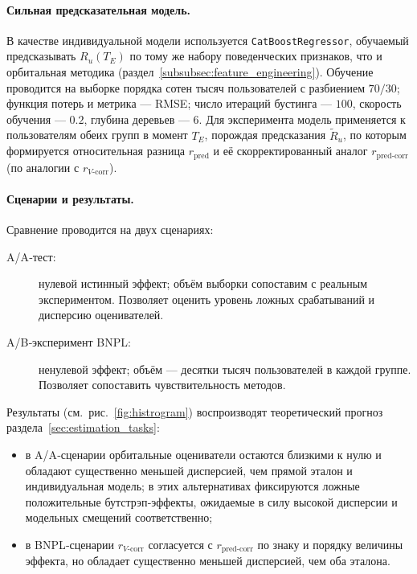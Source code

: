 \paragraph{Сильная предсказательная модель.}

В качестве индивидуальной модели используется
\texttt{CatBoostRegressor}, обучаемый предсказывать $R_u(T_E)$ по тому
же набору поведенческих признаков, что и орбитальная методика
(раздел~\ref{subsubsec:feature_engineering}). Обучение проводится на
выборке порядка сотен тысяч пользователей с разбиением $70/30$;
функция потерь и метрика — RMSE; число итераций бустинга — $100$,
скорость обучения — $0.2$, глубина деревьев — $6$. Для эксперимента
модель применяется к пользователям обеих групп в момент $T_E$,
порождая предсказания $\tilde{R}_u$, по которым формируется
относительная разница $r_{\text{pred}}$ и её скорректированный аналог
$r_{\text{pred-corr}}$ (по аналогии с $r_{V\text{-corr}}$).

\paragraph{Сценарии и результаты.}

Сравнение проводится на двух сценариях:
\begin{description}
    \item[A/A‑тест:] нулевой истинный эффект; объём выборки сопоставим
          с реальным экспериментом. Позволяет оценить уровень ложных
          срабатываний и дисперсию оценивателей.
    \item[A/B‑эксперимент BNPL:] ненулевой эффект; объём — десятки
          тысяч пользователей в каждой группе. Позволяет сопоставить
          чувствительность методов.
\end{description}

Результаты (см.~рис.~\ref{fig:histrogram}) воспроизводят
теоретический прогноз раздела~\ref{sec:estimation_tasks}:
\begin{itemize}
    \item в A/A‑сценарии орбитальные оцениватели остаются близкими
          к нулю и обладают существенно меньшей дисперсией, чем
          прямой эталон и индивидуальная модель; в этих
          альтернативах фиксируются ложные положительные
          бутстрэп‑эффекты, ожидаемые в силу высокой дисперсии и
          модельных смещений соответственно;
    \item в BNPL‑сценарии $r_{V\text{-corr}}$ согласуется с
          $r_{\text{pred-corr}}$ по знаку и порядку величины эффекта,
          но обладает существенно меньшей дисперсией, чем оба
          эталона.
\end{itemize}

